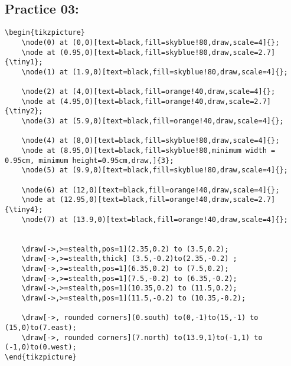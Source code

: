 \documentclass{article}
\begin{document}
		\subsection{Practice 03:}
\begin{lstlisting}
\begin{tikzpicture}
	\node(0) at (0,0)[text=black,fill=skyblue!80,draw,scale=4]{};
	\node at (0.95,0)[text=black,fill=skyblue!80,draw,scale=2.7]{\tiny1};
	\node(1) at (1.9,0)[text=black,fill=skyblue!80,draw,scale=4]{};
			
	\node(2) at (4,0)[text=black,fill=orange!40,draw,scale=4]{};
	\node at (4.95,0)[text=black,fill=orange!40,draw,scale=2.7]{\tiny2};
	\node(3) at (5.9,0)[text=black,fill=orange!40,draw,scale=4]{};
			
	\node(4) at (8,0)[text=black,fill=skyblue!80,draw,scale=4]{};
	\node at (8.95,0)[text=black,fill=skyblue!80,minimum width = 0.95cm, minimum height=0.95cm,draw,]{3};
	\node(5) at (9.9,0)[text=black,fill=skyblue!80,draw,scale=4]{};
			
	\node(6) at (12,0)[text=black,fill=orange!40,draw,scale=4]{};
	\node at (12.95,0)[text=black,fill=orange!40,draw,scale=2.7]{\tiny4};
	\node(7) at (13.9,0)[text=black,fill=orange!40,draw,scale=4]{};
			
			
	\draw[->,>=stealth,pos=1](2.35,0.2) to (3.5,0.2);
	\draw[->,>=stealth,thick] (3.5,-0.2)to(2.35,-0.2) ;
	\draw[->,>=stealth,pos=1](6.35,0.2) to (7.5,0.2);
	\draw[->,>=stealth,pos=1](7.5,-0.2) to (6.35,-0.2);
	\draw[->,>=stealth,pos=1](10.35,0.2) to (11.5,0.2);
	\draw[->,>=stealth,pos=1](11.5,-0.2) to (10.35,-0.2);
			
	\draw[->, rounded corners](0.south) to(0,-1)to(15,-1) to (15,0)to(7.east);
	\draw[->, rounded corners](7.north) to(13.9,1)to(-1,1) to (-1,0)to(0.west);
\end{tikzpicture}
\end{lstlisting}
\end{document}

